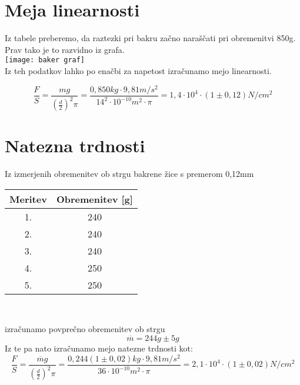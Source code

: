 \documentclass[a4paper]{report}
\begin{document}
\section*{Meja linearnosti}
Iz tabele preberemo, da raztezki pri bakru začno naraščati pri obremenitvi 850g. Prav tako je to razvidno iz grafa.\\
\texttt{[image: baker graf]}\\
Iz teh podatkov lahko po enačbi za napetost izračunamo mejo linearnosti.

\[\frac{F}{S}=\frac{mg}{(\frac{d}{2})^2\pi}=\frac{0,850kg\cdot 9,81 m/s^2}{14^2\cdot 10^{-10}m^2\cdot\pi}=1,4\cdot 10^{4}\cdot(1\pm0,12)N/cm^2\]

\section*{Natezna trdnosti}
Iz izmerjenih obremenitev ob strgu bakrene žice s premerom 0,12mm\\

\begin{center}
\begin{tabular}{| c | c |}
\hline
Meritev & Obremenitev [g]\\
\hline
1. & 240\\
2. & 240\\
3. & 240\\
4. & 250\\
5. & 250\\ \hline
\end{tabular}\\
\end{center}
\noindent izračunamo povprečno obremenitev ob strgu
\[\overline{m}=244g \pm 5g \]
Iz te pa nato izračunamo mejo natezne trdnosti kot:
\[\frac{F}{S}=\frac{\overline{m}g}{(\frac{d}{2})^2\pi}=\frac{0,244(1\pm0,02)kg\cdot 9,81 m/s^2}{36\cdot 10^{-10}m^2\cdot\pi}=2,1\cdot 10^{4}\cdot(1\pm0,02)N/cm^2\]
\end{document}
